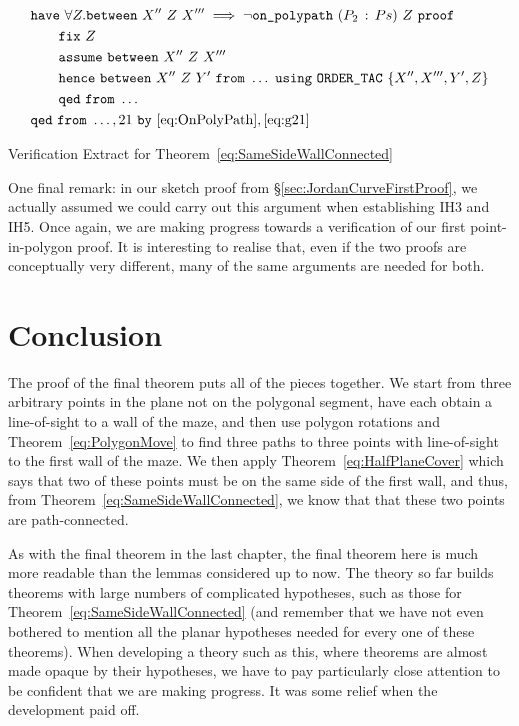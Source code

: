 \begin{boxedfigure}
\begin{align*}
  &\code{have}\ \forall Z. \between{X''}{Z}{X'''} \implies \neg\code{on\_polypath}\ (\cons{P_2}{Ps})\ Z\ \code{proof}\\
  &\qquad \code{fix}\ Z\\
  &\qquad \code{assume}\ \between{X''}{Z}{X'''}\\
  &\qquad \code{hence}\ \between{X''}{Z}{Y'}\ \code{from}\ \ldots\ \code{using}\ \code{ORDER\_TAC}\ \{X'',X''',Y',Z\}\\
  &\qquad \code{qed}\ \code{from}\ \ldots\\
  &\code{qed}\ \code{from}\ \ldots,21\ \code{by}\ \eqref{eq:OnPolyPath},\eqref{eq:g21}
\end{align*}
\caption{Verification Extract for Theorem~\ref{eq:SameSideWallConnected}}
\label{fig:SameSideWallConnectedExtract}
\end{boxedfigure}

One final remark: in our sketch proof from \S\ref{sec:JordanCurveFirstProof}, we actually assumed we could carry out this argument when establishing IH3 and IH5. Once again, we are making progress towards a verification of our first point-in-polygon proof. It is interesting to realise that, even if the two proofs are conceptually very different, many of the same arguments are needed for both.

\section{Conclusion}
The proof of the final theorem puts all of the pieces together. We start from three arbitrary points in the plane not on the polygonal segment, have each obtain a line-of-sight to a wall of the maze, and then use polygon rotations and Theorem~\ref{eq:PolygonMove} to find three paths to three points with line-of-sight to the first wall of the maze. We then apply  Theorem~\ref{eq:HalfPlaneCover} which says that two of these points must be on the same side of the first wall, and thus, from Theorem~\ref{eq:SameSideWallConnected}, we know that that these two points are path-connected.

As with the final theorem in the last chapter, the final theorem here is much more readable than the lemmas considered up to now. The theory so far builds theorems with large numbers of complicated hypotheses, such as those for Theorem~\ref{eq:SameSideWallConnected} (and remember that we have not even bothered to mention all the planar hypotheses needed for every one of these theorems). When developing a theory such as this, where theorems are almost made opaque by their hypotheses, we have to pay particularly close attention to be confident that we are making progress. It was some relief when the development paid off.

